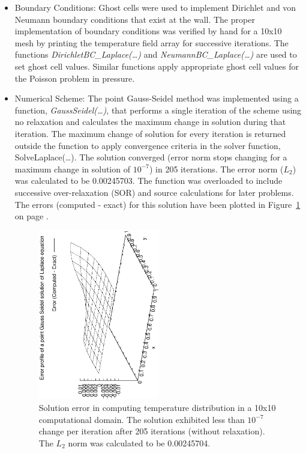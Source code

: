 \documentclass[a4paper,10pt]{article}
\begin{document}
\begin{itemize}
  \item Boundary Conditions: Ghost cells were used to implement Dirichlet and von Neumann boundary conditions that exist at the wall. The proper implementation of boundary conditions was verified by hand for a 10x10 mesh by printing the temperature field array for successive iterations. The functions \emph{DirichletBC\_Laplace(\ldots)} and \emph{NeumannBC\_Laplace(\ldots)} are used to set ghost cell values. Similar functions apply appropriate ghost cell values for the Poisson problem in pressure.
  
  \item Numerical Scheme: The point Gauss-Seidel method was implemented using a function, \emph{GaussSeidel(\ldots)}, that performs a single iteration of the scheme using no relaxation and calculates the maximum change in solution during that iteration. The maximum change of solution for every iteration is returned outside the function to apply convergence criteria in the solver function, SolveLaplace(\ldots). The solution converged (error norm stops changing for a maximum change in solution of $10^{-7}$) in 205 iterations. The error norm ($L_2$) was calculated to be 0.00245703. The function was overloaded to include successive over-relaxation (SOR) and source calculations for later problems. The errors (computed - exact) for this solution have been plotted in Figure~\ref{errors} on page \pageref{errors}.

    \begin{figure}
      \centering
      \includegraphics[width=0.5\textwidth, angle = -90]{../plots/mesh1/errors}
      \caption{Solution error in computing temperature distribution in a 10x10 computational domain. The solution exhibited less than $10^{-7}$ change per iteration after 205 iterations (without relaxation). The $L_2$ norm was calculated to be 0.00245704.}                
      \label{errors}
    \end{figure}
    

\end{itemize}
\end{document}
